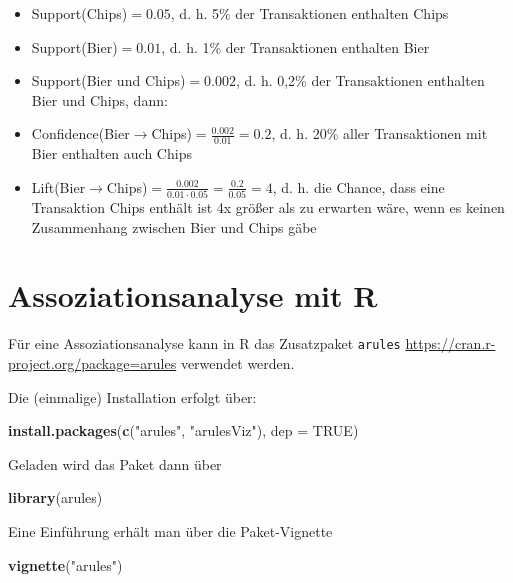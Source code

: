\documentclass[12pt,]{book}
\makeatletter
\newenvironment{Shaded}{\begin{snugshade}}{\end{snugshade}}
\newcommand{\KeywordTok}[1]{\textcolor[rgb]{0.13,0.29,0.53}{\textbf{{#1}}}}
\newcommand{\DataTypeTok}[1]{\textcolor[rgb]{0.13,0.29,0.53}{{#1}}}
\newcommand{\StringTok}[1]{\textcolor[rgb]{0.31,0.60,0.02}{{#1}}}
\newcommand{\OtherTok}[1]{\textcolor[rgb]{0.56,0.35,0.01}{{#1}}}
\newcommand{\NormalTok}[1]{{#1}}
\providecommand{\tightlist}{%
  \setlength{\itemsep}{0pt}\setlength{\parskip}{0pt}}
\newenvironment{kframe}{%
\medskip{}
\setlength{\fboxsep}{.8em}
 \def\at@end@of@kframe{}%
 \ifinner\ifhmode%
  \def\at@end@of@kframe{\end{minipage}}%
  \begin{minipage}{\columnwidth}%
 \fi\fi%
 \def\FrameCommand##1{\hskip\@totalleftmargin \hskip-\fboxsep
 \colorbox{shadecolor}{##1}\hskip-\fboxsep
     \hskip-\linewidth \hskip-\@totalleftmargin \hskip\columnwidth}%
 \MakeFramed {\advance\hsize-\width
   \@totalleftmargin\z@ \linewidth\hsize
   \@setminipage}}%
 {\par\unskip\endMakeFramed%
 \at@end@of@kframe}
\renewenvironment{Shaded}{\begin{kframe}}{\end{kframe}}
\makeatother
\begin{document}
\begin{itemize}
\tightlist
\item
  Support(Chips)\(=0.05\), d. h. 5\% der Transaktionen enthalten Chips
\item
  Support(Bier)\(=0.01\), d. h. 1\% der Transaktionen enthalten Bier
\item
  Support(Bier und Chips)\(=0.002\), d. h. 0,2\% der Transaktionen
  enthalten Bier und Chips, dann:
\item
  Confidence(Bier\(\rightarrow\)Chips)\(=\frac{0.002}{0.01}=0.2\), d. h.
  20\% aller Transaktionen mit Bier enthalten auch Chips
\item
  Lift(Bier\(\rightarrow\)Chips)\(=\frac{0.002}{0.01\cdot 0.05}=\frac{0.2}{0.05}=4\),
  d. h. die Chance, dass eine Transaktion Chips enthält ist 4x größer
  als zu erwarten wäre, wenn es keinen Zusammenhang zwischen Bier und
  Chips gäbe
\end{itemize}

\section{Assoziationsanalyse mit R}\label{assoziationsanalyse-mit-r}

Für eine Assoziationsanalyse kann in R das Zusatzpaket \texttt{arules}
\url{https://cran.r-project.org/package=arules} verwendet werden.

Die (einmalige) Installation erfolgt über:

\begin{Shaded}
\begin{Highlighting}[]
\KeywordTok{install.packages}\NormalTok{(}\KeywordTok{c}\NormalTok{(}\StringTok{"arules"}\NormalTok{, }\StringTok{"arulesViz"}\NormalTok{), }\DataTypeTok{dep =} \OtherTok{TRUE}\NormalTok{)}
\end{Highlighting}
\end{Shaded}

Geladen wird das Paket dann über

\begin{Shaded}
\begin{Highlighting}[]
\KeywordTok{library}\NormalTok{(arules)}
\end{Highlighting}
\end{Shaded}

Eine Einführung erhält man über die Paket-Vignette

\begin{Shaded}
\begin{Highlighting}[]
\KeywordTok{vignette}\NormalTok{(}\StringTok{"arules"}\NormalTok{)}
\end{Highlighting}
\end{Shaded}
\end{document}
